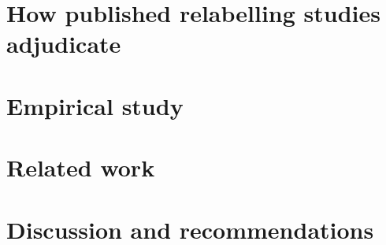 \documentclass[twoside,11pt]{article}
\newcommand{\1}{\mathbf{1}}
\begin{document}
\section{How published relabelling studies adjudicate}
\label{sec:practice}



\section{Empirical study}
\label{sec:empirical}



\section{Related work}
\label{sec:related}



\section{Discussion and recommendations}
\label{sec:discussion}




\newpage
\appendix

\FloatBarrier

\vskip 0.2in

\end{document}
